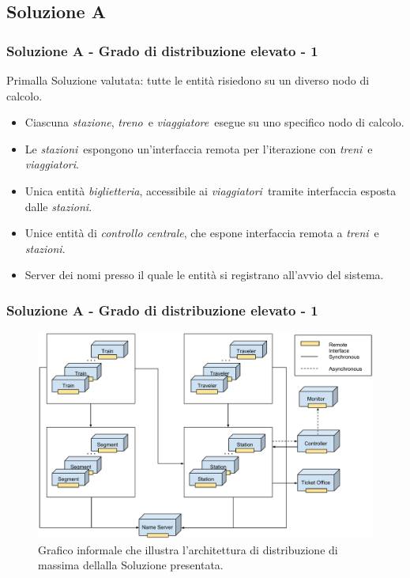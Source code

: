 \documentclass[slidestop,compress,blackandwhite]{beamer}
\newcommand{\ii}[1]{\textit{#1}}
\newcommand{\treno}{\ii{treno}}
\newcommand{\treni}{\ii{treni}}
\newcommand{\viaggiatore}{\ii{viaggiatore}}
\newcommand{\viaggiatori}{\ii{viaggiatori}}
\newcommand{\stazione}{\ii{stazione}}
\newcommand{\stazioni}{\ii{stazioni}}
\newcommand{\biglietteria}{\ii{biglietteria}}
\newcommand{\controller}{\ii{controllo centrale}}
\begin{document}
	\subsection{Soluzione A}
	\begin{frame}
		\frametitle{Soluzione A - Grado di distribuzione elevato - 1}
		Primalla Soluzione valutata: tutte le entità risiedono su un diverso nodo di calcolo.
		\begin{itemize}
			\item Ciascuna \stazione, \treno~e \viaggiatore~esegue su uno specifico nodo di calcolo.  
			\item Le \stazioni~espongono un'interfaccia remota per l'iterazione con \treni~e \viaggiatori.
			\item Unica entità \biglietteria, accessibile ai \viaggiatori~tramite interfaccia esposta dalle \stazioni.
			\item Unice entità di \controller, che espone interfaccia remota a \treni~e \stazioni.
			\item Server dei nomi presso il quale le entità si registrano all'avvio del sistema.
		\end{itemize}
	\end{frame}
	
	\begin{frame}
		\frametitle{Soluzione A - Grado di distribuzione elevato - 1}
		\begin{figure}
			\includegraphics[scale=0.24,trim=0mm 5mm 0mm 20mm]{imgs/All_distributed.pdf}
			\caption{\small{Grafico informale che illustra l'architettura di distribuzione di massima dellalla Soluzione presentata.}}
		\end{figure}
	\end{frame}
	
			
	
\end{document}

